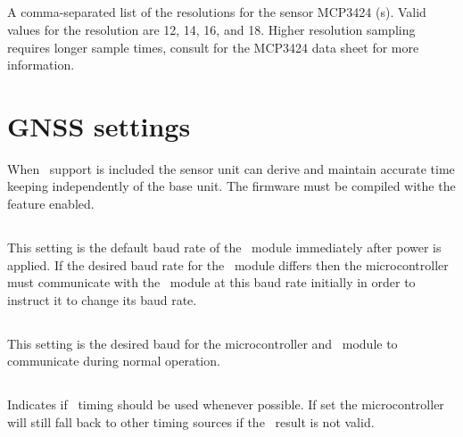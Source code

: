
\subsection[adc-resolution-list]{}

A comma-separated list of the resolutions for the sensor MCP3424
\adc(s). Valid values for the resolution are 12, 14, 16, and
18. Higher resolution sampling requires longer sample times, consult
for the MCP3424 data sheet for more information.

\section{GNSS settings}

When \gnss\ support is included the sensor unit can derive and
maintain accurate time keeping independently of the base unit. The
firmware must be compiled withe the  feature
enabled.

\subsection[gnss-default-baud-rate]{}

This setting is the default baud rate of the \gnss\ module immediately
after power is applied. If the desired baud rate for the \gnss\ module
differs then the microcontroller must communicate with the \gnss\
module at this baud rate initially in order to instruct it to change
its baud rate.

\subsection[gnss-desired-baud-rate]{}

This setting is the desired baud for the microcontroller and \gnss\
module to communicate during normal operation.

\subsection[use-gnss]{}

Indicates if \gnss\ timing should be used whenever possible. If set
the microcontroller will still fall back to other timing sources if
the \gnss\ result is not valid.

